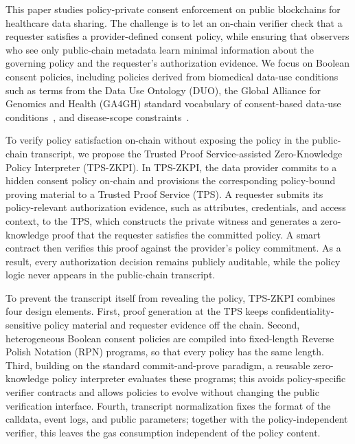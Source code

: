 This paper studies policy-private consent enforcement on public blockchains for healthcare data sharing.
The challenge is to let an on-chain verifier check that a requester satisfies a provider-defined consent policy, while ensuring that observers who see only public-chain metadata learn minimal information about the governing policy and the requester's authorization evidence.
We focus on Boolean consent policies, including policies derived from biomedical data-use conditions such as terms from the Data Use Ontology (DUO), the Global Alliance for Genomics and Health (GA4GH) standard vocabulary of consent-based data-use conditions~\cite{lawson2021data}, and disease-scope constraints~\cite{WHO_ICD10}.

To verify policy satisfaction on-chain without exposing the policy in the public-chain transcript, we propose the Trusted Proof Service-assisted Zero-Knowledge Policy Interpreter (TPS-ZKPI).
In TPS-ZKPI, the data provider commits to a hidden consent policy on-chain and provisions the corresponding policy-bound proving material to a Trusted Proof Service (TPS).
A requester submits its policy-relevant authorization evidence, such as attributes, credentials, and access context, to the TPS, which constructs the private witness and generates a zero-knowledge proof that the requester satisfies the committed policy.
A smart contract then verifies this proof against the provider's policy commitment.
As a result, every authorization decision remains publicly auditable, while the policy logic never appears in the public-chain transcript.

To prevent the transcript itself from revealing the policy, TPS-ZKPI combines four design elements.
First, proof generation at the TPS keeps confidentiality-sensitive policy material and requester evidence off the chain.
Second, heterogeneous Boolean consent policies are compiled into fixed-length Reverse Polish Notation (RPN) programs, so that every policy has the same length.
Third, building on the standard commit-and-prove paradigm, a reusable zero-knowledge policy interpreter evaluates these programs; this avoids policy-specific verifier contracts and allows policies to evolve without changing the public verification interface.
Fourth, transcript normalization fixes the format of the calldata, event logs, and public parameters; together with the policy-independent verifier, this leaves the gas consumption independent of the policy content.

